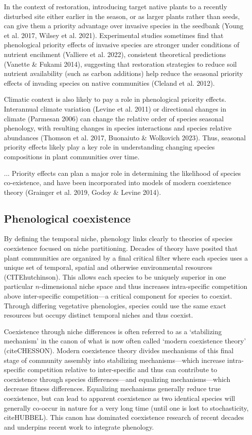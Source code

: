 \documentclass[11pt]{article}
\begin{document}
In the context of restoration, introducing target native plants to a recently disturbed site either earlier in the season, or as larger plants rather than seeds, can give them a priority advantage over invasive species in the seedbank (Young et al. 2017, Wilsey et al. 2021). Experimental studies sometimes find that phenological priority effects of invasive species are stronger under conditions of nutrient encihment (Valliere et al. 2022), consistent theoretical predictions (Vanette \& Fukami 2014), suggesting that restoration strategies to reduce soil nutrient availability (such as carbon additions) help reduce the seasonal priority effects of invading species on native communities (Cleland et al. 2012).

Climatic context is also likely to pay a role in phenological priority effects. Interannual climate variation (Levine et al. 2011) or directional changes in climate (Parmesan 2006) can change the relative order of species seasonal phenology, with resulting changes in species interactions and species relative abundances (Thomson et al. 2017, Buonaiuto \& Wolkovich 2023). Thus, seasonal priority effects likely play a key role in understanding changing species compositions in plant communities over time.

...
Priority effects can plan a major role in determining the likelihood of species co-existence, and have been incorporated into models of modern coexistence theory (Grainger et al. 2019, Godoy \& Levine 2014).

\subsection*{Phenological coexistence}

By defining the temporal niche, phenology links clearly to theories of species coexistence focused on niche partitioning. Decades of theory have posited that plant communities are organized by a final critical filter where each species uses a unique set of temporal, spatial and otherwise environmental resources (CITEhutchinson). This allows each species to be uniquely superior in one particular $n$-dimensional niche space and thus increases intra-specific competition above inter-specific competition---a critical component for species to coexist. Through differing vegetative phenologies, species could use the same exact resources but occupy distinct temporal niches and thus coexist. 

Coexistence through niche differences is often referred to as a `stabilizing mechanism' in the canon of what is now often called `modern coexistence theory' (citeCHESSON). Modern coexistence theory divides mechanisms of this final stage of community assembly into stabilizing mechanisms---which increase intra-specific competition relative to inter-specific and thus can contribute to coexistence through species differences---and equalizing mechanisms---which decrease fitness differences. Equalizing mechanisms generally reduce true coexistence, but can lead to apparent coexistence as two identical species will generally co-occur in nature for a very long time (until one is lost to stochasticity, citeHUBBEL). This canon has dominated coexistence research of recent decades and underpins recent work to integrate phenology.
\end{document}
